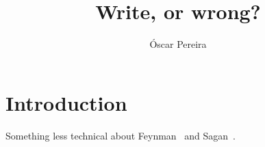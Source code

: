 \documentclass[a4paper,12pt,dvipsnames*]{article}
\title{
Write, or wrong?
}
\author{
  Óscar Pereira
}
\date{\vspace{-4em}}
\begin{document}
\maketitle
{}

\tableofcontents

\section{Introduction}
  Something less technical about Feynman~\cite{Feynman74} and Sagan~\cite{Sagan}.

{}


\end{document}
